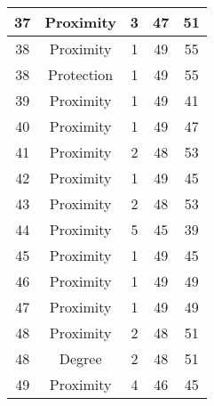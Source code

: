 \documentclass[results.tex]{subfiles}
\begin{document}
\begin{center}
\begin{tabular}{| c || c | c | c | c |}
            \hline
            37                      & Proximity                    & 3                      & 47                      & 51                   \\
            \hline
            38                      & Proximity                    & 1                      & 49                      & 55                   \\
            \hline
            38                      & Protection                   & 1                      & 49                      & 55                   \\
            \hline
            39                      & Proximity                    & 1                      & 49                      & 41                   \\
            \hline
            40                      & Proximity                    & 1                      & 49                      & 47                   \\
            \hline
            41                      & Proximity                    & 2                      & 48                      & 53                   \\
            \hline
            42                      & Proximity                    & 1                      & 49                      & 45                   \\
            \hline
            43                      & Proximity                    & 2                      & 48                      & 53                   \\
            \hline
            44                      & Proximity                    & 5                      & 45                      & 39                   \\
            \hline
            45                      & Proximity                    & 1                      & 49                      & 45                   \\
            \hline
            46                      & Proximity                    & 1                      & 49                      & 49                   \\
            \hline
            47                      & Proximity                    & 1                      & 49                      & 49                   \\
            \hline
            48                      & Proximity                    & 2                      & 48                      & 51                   \\
            \hline
            48                      & Degree                       & 2                      & 48                      & 51                   \\
            \hline
            49                      & Proximity                    & 4                      & 46                      & 45                   \\
            \hline
        \end{tabular}
    \end{center}
\end{document}
